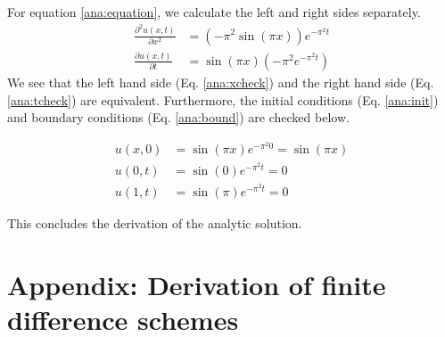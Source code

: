 For equation \ref{ana:equation}, we calculate the left and right sides separately.
\begin{align}
    \label{ana:xcheck}
    \frac{\partial^2 u(x,t)}{\partial x^2} &= \left(-\pi^2 \sin(\pi x)\right) e^{-\pi^2 t} \\
    \label{ana:tcheck}
    \frac{\partial u(x,t)}{\partial t} &=  \sin(\pi x) \left(-\pi^2 e^{-\pi^2 t}\right)
\end{align}
We see that the left hand side (Eq. \ref{ana:xcheck}) and the right hand side (Eq. \ref{ana:tcheck}) are equivalent.
Furthermore, the initial conditions (Eq. \ref{ana:init}) and boundary conditions (Eq. \ref{ana:bound}) are checked below.

\begin{align*}
    u(x, 0) &= \sin(\pi x) e^{-\pi^2 0} = \sin(\pi x) \\
    u(0, t) &= \sin(0)e^{-\pi^2 t} = 0 \\
    u(1, t) &= \sin(\pi)e^{-\pi^2 t} = 0
\end{align*}

This concludes the derivation of the analytic solution.

\section{Appendix: Derivation of finite difference schemes} \label{app:c}